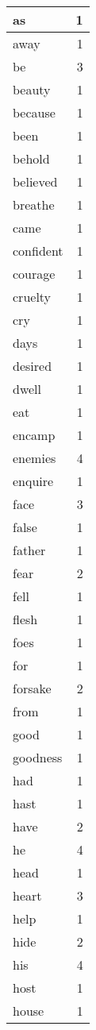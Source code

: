 \begin{center}
\begin{longtable}{l|r}
as & 1 \\ \hline
away & 1 \\ \hline
be & 3 \\ \hline
beauty & 1 \\ \hline
because & 1 \\ \hline
been & 1 \\ \hline
behold & 1 \\ \hline
believed & 1 \\ \hline
breathe & 1 \\ \hline
came & 1 \\ \hline
confident & 1 \\ \hline
courage & 1 \\ \hline
cruelty & 1 \\ \hline
cry & 1 \\ \hline
days & 1 \\ \hline
desired & 1 \\ \hline
dwell & 1 \\ \hline
eat & 1 \\ \hline
encamp & 1 \\ \hline
enemies & 4 \\ \hline
enquire & 1 \\ \hline
face & 3 \\ \hline
false & 1 \\ \hline
father & 1 \\ \hline
fear & 2 \\ \hline
fell & 1 \\ \hline
flesh & 1 \\ \hline
foes & 1 \\ \hline
for & 1 \\ \hline
forsake & 2 \\ \hline
from & 1 \\ \hline
good & 1 \\ \hline
goodness & 1 \\ \hline
had & 1 \\ \hline
hast & 1 \\ \hline
have & 2 \\ \hline
he & 4 \\ \hline
head & 1 \\ \hline
heart & 3 \\ \hline
help & 1 \\ \hline
hide & 2 \\ \hline
his & 4 \\ \hline
host & 1 \\ \hline
house & 1 \\ \hline

\end{longtable}
\end{center}
